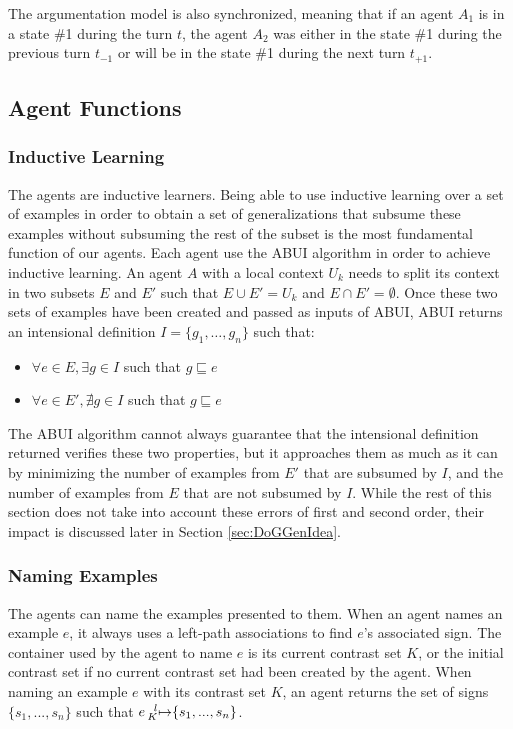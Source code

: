 The argumentation model is also synchronized, meaning that if an agent $A_{1}$ is in a state \#1 during the turn $t$, the agent $A_{2}$ was either in the state \#1 during the previous turn $t_{-1}$ or will be in the state \#1 during the next turn $t_{+1}$.

\subsection{Agent Functions}

\subsubsection{Inductive Learning}

\label{sec:funIndLearn}
The agents are inductive learners. Being able to use inductive learning over a set of examples in order to obtain a set of generalizations that subsume these examples without subsuming the rest of the subset is the most fundamental function of our agents. Each agent use the ABUI algorithm in order to achieve inductive learning. An agent $A$ with a local context $U_{k}$ needs to split its context in two subsets $E$ and $E'$ such that $E \cup E' = U_{k}$ and $E \cap E' = \emptyset$. Once these two sets of examples have been created and passed as inputs of ABUI, ABUI returns an intensional definition $I = \{g_{1}, \ldots, g_{n}\}$ such that:

\begin{itemize}
\item $\forall e \in E, \exists g \in I$ such that $g \sqsubseteq e$
\item $\forall e \in E', \nexists g \in I$ such that $g \sqsubseteq e$
\end{itemize}

The ABUI algorithm cannot always guarantee that the intensional definition returned verifies these two properties, but it approaches them as much as it can by minimizing the number of examples from $E'$ that are subsumed by $I$, and the number of examples from $E$ that are not subsumed by $I$. While the rest of this section does not take into account these errors of first and second order, their impact is discussed later in Section \ref{sec:DoGGenIdea}.

\subsubsection{Naming Examples}
\label{sec:funName}

The agents can name the examples presented to them. When an agent names an example $e$, it always uses a left-path associations to find $e$'s associated sign. The container used by the agent to name $e$ is its current contrast set $K$, or the initial contrast set if no current contrast set had been created by the agent. When naming an example $e$ with its contrast set $K$, an agent returns the set of signs $\{s_{1},...,s_{n}\}$ such that $e \prescript{l}{K}{\mapsto} \{s_{1},...,s_{n}\}$.

